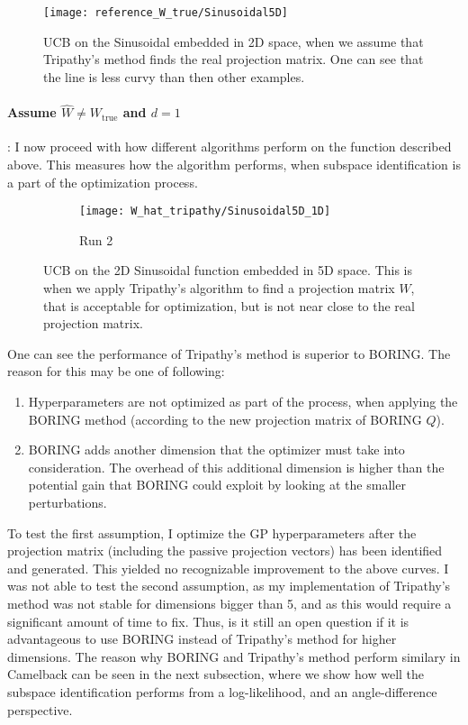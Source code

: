 \begin{figure}[H]
  \centering
      \texttt{[image: reference\_W\_true/Sinusoidal5D]}
  \caption{UCB on the Sinusoidal embedded in 2D space, when we assume that Tripathy's method finds the real projection matrix.
  One can see that the line is less curvy than then other examples.}
\end{figure}

\paragraph{Assume $\hat{W} \neq W_{\text{true}}$ and $d=1$}: I now proceed with how different algorithms perform on the function described above.
This measures how the algorithm performs, when subspace identification is a part of the optimization process.

\begin{figure}[H]
	\centering
    \begin{subfigure}[b]{0.5\textwidth}
        \texttt{[image: W\_hat\_tripathy/Sinusoidal5D\_1D]}
        \label{fig:tiger}
        \caption{Run 2}
    \end{subfigure}   
           \caption{UCB on the 2D Sinusoidal function embedded in 5D space.
  This is when we apply Tripathy's algorithm to find a projection matrix $W$, that is acceptable for optimization, but is not near close to the real projection matrix.}
\end{figure}

One can see the performance of Tripathy's method is superior to BORING.
The reason for this may be one of following:

\begin{enumerate}
\item Hyperparameters are not optimized as part of the process, when applying the BORING method (according to the new projection matrix of BORING $Q$).
\item BORING adds another dimension that the optimizer must take into consideration.
The overhead of this additional dimension is higher than the potential gain that BORING could exploit by looking at the smaller perturbations.
\end{enumerate}

To test the first assumption, I optimize the GP hyperparameters after the projection matrix (including the passive projection vectors) has been identified and generated.
This yielded no recognizable improvement to the above curves.
I was not able to test the second assumption, as my implementation of Tripathy's method was not stable for dimensions bigger than 5, and as this would require a significant amount of time to fix.
Thus, is it still an open question if it is advantageous to use BORING instead of Tripathy's method for higher dimensions.
The reason why BORING and Tripathy's method perform similary in Camelback can be seen in the next subsection, where we show how well the subspace identification performs from a log-likelihood, and an angle-difference perspective.

